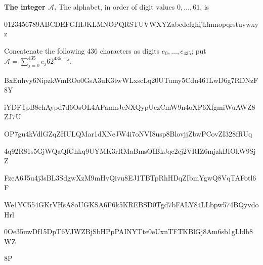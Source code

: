 \textbf{The integer $\mathcal A$.}
The alphabet, in order of digit values $0,\ldots,61$, is\par
\begin{center}
{\fontsize{9.2}{10.5}\selectfont\ttfamily 0123456789ABCDEFGHIJKLMNOPQRSTUVWXYZabcdefghijklmnopqrstuvwxyz}
\end{center}
Concatenate the following 436 characters as digits $e_0,\ldots,e_{435}$;
put $\mathcal A=\sum_{j=0}^{435}e_j62^{435-j}$.\par
\begingroup\fontsize{9.2}{10.5}\selectfont\ttfamily
BxEnhvy6NipzkWmROo0GsA3uK3twWLxscLq20UTumy5Cdu461LwD6g7RDNzF8Y\par
iYDFTpB8ehAypd7d6OsOL4APamnJeNXQypUezCmW9n4oXP6XfgmiWuAWZ8ZJ7U\par
OP7gu4kVdlGZqZHULQMar1dXNeJW4i7oNVI8usp8BlovjjZbwPCovZI328fRUq\par
4q92R81s5GjWQaQfGhkq9UYMK3rRMaBmsOIBkJqc2cj2VRIZ6mjzkBIOkW9SjZ\par
FzeA6J5u4j3sBL3SdgwXzM9mHvQivu8EJ1TBTpRhHDqZIbmYgwQ8VqTAFotl6F\par
We1YC554GKrVHsA8oUGKSA6F6k5KREBSD0Tgd7bFALY84LLbpw574BQyvdoHrl\par
0Oe35uwDf15DpT6VJWZBjSbHPpPAINYTte0eUxnTFTKBlGj8Am6sb1gLldh8WZ\par
8P\par
\endgroup

